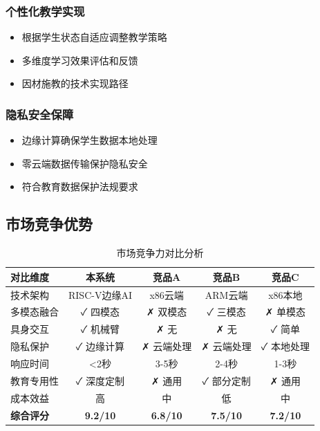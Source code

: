 \documentclass[12pt,a4paper]{article}
\begin{document}
\subsubsection{个性化教学实现}
\begin{itemize}[leftmargin=2em]
    \item 根据学生状态自适应调整教学策略
    \item 多维度学习效果评估和反馈
    \item 因材施教的技术实现路径
\end{itemize}

\subsubsection{隐私安全保障}
\begin{itemize}[leftmargin=2em]
    \item 边缘计算确保学生数据本地处理
    \item 零云端数据传输保护隐私安全
    \item 符合教育数据保护法规要求
\end{itemize}

\subsection{市场竞争优势}

\begin{table}[H]
    \centering
    \caption{市场竞争力对比分析}
    \begin{tabular}{|l|c|c|c|c|}
        \hline
        \textbf{对比维度} & \textbf{本系统} & \textbf{竞品A} & \textbf{竞品B} & \textbf{竞品C} \\
        \hline
        技术架构 & RISC-V边缘AI & x86云端 & ARM云端 & x86本地 \\
        \hline
        多模态融合 & ✓ 四模态 & ✗ 双模态 & ✓ 三模态 & ✗ 单模态 \\
        \hline
        具身交互 & ✓ 机械臂 & ✗ 无 & ✗ 无 & ✓ 简单 \\
        \hline
        隐私保护 & ✓ 边缘计算 & ✗ 云端处理 & ✗ 云端处理 & ✓ 本地处理 \\
        \hline
        响应时间 & <2秒 & 3-5秒 & 2-4秒 & 1-3秒 \\
        \hline
        教育专用性 & ✓ 深度定制 & ✗ 通用 & ✓ 部分定制 & ✗ 通用 \\
        \hline
        成本效益 & 高 & 中 & 低 & 中 \\
        \hline
        \textbf{综合评分} & \textbf{9.2/10} & \textbf{6.8/10} & \textbf{7.5/10} & \textbf{7.2/10} \\
        \hline
    \end{tabular}
    \label{tab:competition}
\end{table}
\end{document}
